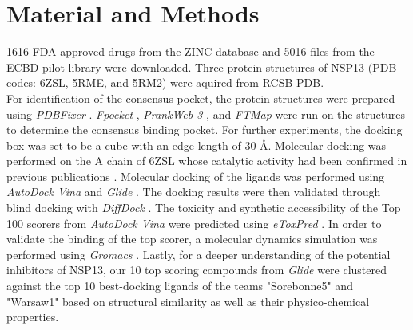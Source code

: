 \documentclass[11pt, letterpaper, titlepage]{article}
\renewcommand{\cite}{\parencite}
\begin{document}
\section{Material and Methods}
1616 FDA-approved drugs from the ZINC database \cite{Irwin.2020} and 5016 files from the ECBD pilot library were downloaded.
Three protein structures of NSP13 (PDB codes: 6ZSL, 5RME, and 5RM2) were aquired from RCSB PDB. \\
\noindent For identification of the consensus pocket, the protein structures were prepared using \textit{PDBFixer} \cite{Eastman_2017}. \textit{Fpocket} \cite{package_Fpocket}, \textit{PrankWeb 3} \cite{package_P2Rank,package_PrankWeb,package_PrankWeb3}, and \textit{FTMap} \cite{package_FTMAP} were run on the structures to determine the consensus binding pocket. For further experiments, the docking box was set to be a cube with an edge length of 30 \AA. Molecular docking was performed on the A chain of 6ZSL whose catalytic activity had been confirmed in previous publications \cite{Berta_2021}. Molecular docking of the ligands was performed using \textit{AutoDock Vina} \cite{Trott.2010} and \textit{Glide} \cite{Friesner2004}. The docking results were then validated through blind docking with \textit{DiffDock} \cite{Corso.2022}. The toxicity and synthetic accessibility of the Top 100 scorers from \textit{AutoDock Vina} were predicted using \textit{eToxPred} \cite{pu2019toxpred}. In order to validate the binding of the top scorer, a molecular dynamics simulation was performed using \textit{Gromacs} \cite{packageGROMACS}. Lastly, for a deeper understanding of the potential inhibitors of NSP13, our 10 top scoring compounds from \textit{Glide} were clustered against the top 10 best-docking ligands of the teams "Sorebonne5" and "Warsaw1" based on structural similarity as well as their physico-chemical properties.\\
\end{document}
